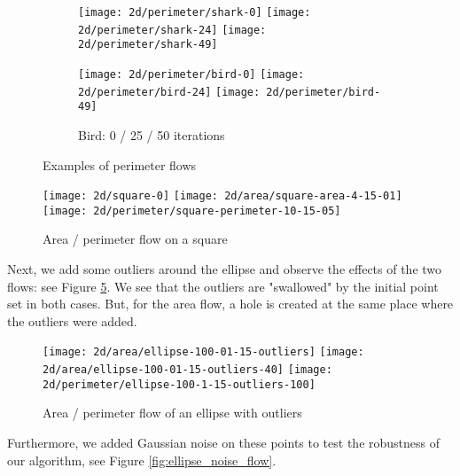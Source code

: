 \begin{figure}[h]
    \centering

    \begin{subfigure}[b]{\textwidth}
        \texttt{[image: 2d/perimeter/shark-0]}
        \texttt{[image: 2d/perimeter/shark-24]}
        \texttt{[image: 2d/perimeter/shark-49]}
        \label{fig:shark_perimeter_flow}
    \end{subfigure}

    \begin{subfigure}[b]{\textwidth}
        \texttt{[image: 2d/perimeter/bird-0]}
        \texttt{[image: 2d/perimeter/bird-24]}
        \texttt{[image: 2d/perimeter/bird-49]}
        \caption{Bird: 0 / 25 / 50 iterations}
        \label{fig:bird_perimeter_flow}
    \end{subfigure}

    \caption{Examples of perimeter flows}
\end{figure}

\begin{figure}[h]
    \centering
    \texttt{[image: 2d/square-0]}
    \texttt{[image: 2d/area/square-area-4-15-01]}
    \texttt{[image: 2d/perimeter/square-perimeter-10-15-05]}
    \caption{Area / perimeter flow on a square}
    \label{fig:area_perimeter_flow_square}
\end{figure}

Next, we add some outliers around the ellipse and observe the effects of the two
flows: see Figure \ref{fig:ellipse_outliers_flow}. We see that the outliers
are "swallowed" by the initial point set in both cases. But, for the area flow,
a hole is created at the same place where the outliers were added.

\begin{figure}[h]
    \centering

    \texttt{[image: 2d/area/ellipse-100-01-15-outliers]}
    \texttt{[image: 2d/area/ellipse-100-01-15-outliers-40]}
    \texttt{[image: 2d/perimeter/ellipse-100-1-15-outliers-100]}
    \caption{Area / perimeter flow of an ellipse with outliers}
    \label{fig:ellipse_outliers_flow}
\end{figure}

Furthermore, we added Gaussian noise on these points to test the robustness
of our algorithm, see Figure \ref{fig:ellipse_noise_flow}.

